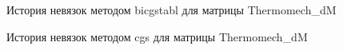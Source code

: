 \begin{figure}[H]
    \renewcommand{\figurename}{Рисунок}
    \caption{История невязок методом bicgstabl для матрицы Thermomech_dM}
    \label{fig:image_25}
\end{figure}

\begin{figure}[H]
    \renewcommand{\figurename}{Рисунок}
    \caption{История невязок методом cgs для матрицы Thermomech_dM}
    \label{fig:image_26}
\end{figure}


